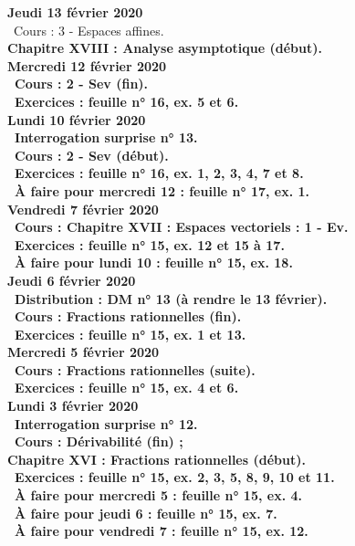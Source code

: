 \documentclass[12pt,a4paper]{article}
\begin{document}
\noindent\textbf{Jeudi 13 février 2020}\\
\bu\ Cours : 3 - Espaces affines.\\
\bf Chapitre XVIII \rm : Analyse asymptotique (début).\vspace{.4cm}\\

\noindent\textbf{Mercredi 12 février 2020} \\
\bu\ Cours : 2 - Sev (fin).\\
\bu\ Exercices : feuille n° 16, ex. 5 et 6.\vspace{.4cm}\\
 
\noindent\textbf{\bf Lundi 10 février 2020} \\
\bu\ Interrogation surprise n° 13.\\
\bu\ Cours : 2 - Sev (début).\\
\bu\ Exercices : feuille n° 16, ex. 1, 2, 3, 4, 7 et 8.\\
\bu\ À faire pour mercredi 12 : feuille n° 17, ex. 1.\vspace{.4cm}\\

\noindent\textbf{Vendredi 7 février 2020}\\
\bu\ Cours : \bf Chapitre XVII \rm : Espaces vectoriels : 1 - Ev.\\
\bu\ Exercices : feuille n° 15, ex. 12 et 15 à 17.\\
\bu\ À faire pour lundi 10 : feuille n° 15, ex. 18.\vspace{.4cm}\\
 
\noindent\textbf{Jeudi 6 février 2020}\\
\bu\ Distribution : DM n° 13 (à rendre le 13 février).\\
\bu\ Cours : Fractions rationnelles (fin).\\
\bu\ Exercices : feuille n° 15, ex. 1 et 13.\vspace{.4cm}\\
 
\noindent\textbf{Mercredi 5 février 2020} \\
\bu\ Cours : Fractions rationnelles (suite).\\
\bu\ Exercices : feuille n° 15, ex. 4 et 6.\vspace{.4cm}\\

\noindent\textbf{\bf Lundi 3 février 2020} \\
\bu\ Interrogation surprise n° 12.\\
\bu\ Cours :  Dérivabilité (fin) ;\\
\bf Chapitre XVI \rm : Fractions rationnelles (début).\\
\bu\ Exercices : feuille n° 15, ex. 2, 3, 5, 8, 9, 10 et 11.\\
\bu\ À faire pour mercredi 5 : feuille n° 15, ex. 4.\\
\bu\ À faire pour jeudi 6 : feuille n° 15, ex. 7.\\
\bu\ À faire pour vendredi 7 : feuille n° 15, ex. 12.\vspace{.4cm}\\
 
\end{document}
